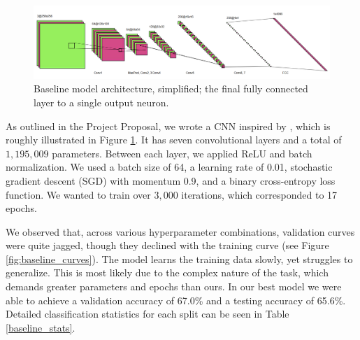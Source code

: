\documentclass{article} %
\begin{document}
\begin{figure}[h]
    \begin{center}
        \includegraphics[scale=0.45]{figs/baseline.png}
    \end{center}
    \caption{Baseline model architecture, simplified; the final fully connected layer to a single output neuron.}
    \label{fig:baseline_arch}
\end{figure}

As outlined in the Project Proposal, we wrote a CNN inspired by \citet{wang2020cnngeneratedimagessurprisinglyeasy}, which is roughly illustrated in Figure \ref{fig:baseline_arch}. It has seven convolutional layers and a total of $1,195,009$ parameters. Between each layer, we applied ReLU and batch normalization. We used a batch size of 64, a learning rate of 0.01, stochastic gradient descent (SGD) with momentum 0.9, and a binary cross-entropy loss function. We wanted to train over $3,000$ iterations, which corresponded to 17 epochs.

We observed that, across various hyperparameter combinations, validation curves were quite jagged, though they declined with the training curve (see Figure \ref{fig:baseline_curves}). The model learns the training data slowly, yet struggles to generalize. This is most likely due to the complex nature of the task, which demands greater parameters and epochs than ours. In our best model we were able to achieve a validation accuracy of 67.0\% and a testing accuracy of 65.6\%. Detailed classification statistics for each split can be seen in Table \ref{baseline_stats}.
\end{document}
